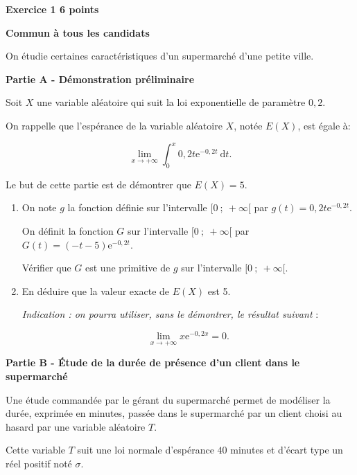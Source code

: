 \documentclass[10pt,a4paper]{article}
\begin{document}
\vspace{0,5cm}

\textbf{Exercice 1 \hfill  6 points}

\textbf{Commun à  tous les candidats}

\medskip

On étudie certaines caractéristiques d'un supermarché d'une petite ville.

\bigskip

\textbf{Partie A - Démonstration préliminaire}

\medskip

Soit $X$ une variable aléatoire qui suit la loi exponentielle de paramètre $0,2$.

On rappelle que l'espérance de la variable aléatoire $X$, notée $E(X)$, est égale à:

\[\displaystyle\lim_{x \to + \infty}\displaystyle\int_{0}^{x}  0,2t\text{e}^{-0,2t}\:\text{d}t.\]

Le but de cette partie est de démontrer que $E(X) = 5$.

\medskip

\begin{enumerate}
\item On note $g$ la fonction définie sur l'intervalle $[0~;~+\infty[$ par $g(t) = 0,2t\text{e}^{-0,2t}$.

On définit la fonction $G$ sur l'intervalle $[0~;~+\infty[$ par $G(t) = (- t - 5)\text{e}^{-0,2t}$.

Vérifier que $G$ est une primitive de $g$ sur l'intervalle $[0~;~+\infty[$.
\item  En déduire que la valeur exacte de $E(X)$ est 5.

\emph{Indication : on pourra utiliser, sans le démontrer, le résultat suivant }:

\[\displaystyle\lim_{x \to + \infty} x \text{e}^{- 0,2x} = 0.\]
\end{enumerate}

\bigskip

\textbf{Partie B - Étude de la durée de présence d'un client dans le supermarché}

\medskip

Une étude commandée par le gérant du supermarché permet de modéliser la durée, exprimée en
minutes, passée dans le supermarché par un client choisi au hasard par une variable aléatoire $T$.

Cette variable $T$ suit une loi normale d'espérance $40$ minutes et d'écart type un réel positif noté $\sigma$.
\end{document}
